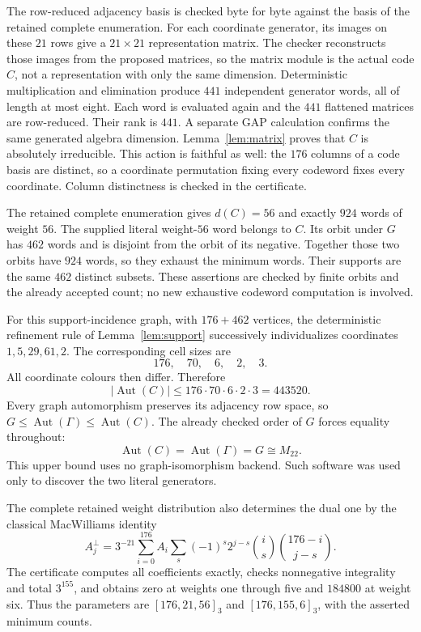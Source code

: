 \documentclass[11pt,a4paper]{article}
\newcommand{\Aut}{\operatorname{Aut}}
\begin{document}
The row-reduced adjacency basis is checked byte for byte against the basis
of the retained complete enumeration. For each coordinate generator, its
images on these $21$ rows give a $21\times21$ representation matrix.
The checker reconstructs those images from the proposed matrices, so the
matrix module is the actual code $C$, not a representation with only the
same dimension. Deterministic multiplication and elimination produce
$441$ independent generator words, all of length at most eight. Each word
is evaluated again and the $441$ flattened matrices are row-reduced.
Their rank is $441$. A separate GAP calculation confirms the same generated
algebra dimension. Lemma~\ref{lem:matrix} proves that $C$ is absolutely
irreducible. This action is faithful as well: the $176$ columns of a code
basis are distinct, so a coordinate permutation fixing every codeword
fixes every coordinate. Column distinctness is checked in the certificate.

The retained complete enumeration gives $d(C)=56$ and exactly $924$ words
of weight $56$. The supplied literal weight-$56$ word belongs to $C$.
Its orbit under $G$ has $462$ words and is disjoint from the orbit of its
negative. Together those two orbits have $924$ words, so they exhaust the
minimum words. Their supports are the same $462$ distinct subsets.
These assertions are checked by finite orbits and the already accepted
count; no new exhaustive codeword computation is involved.

For this support-incidence graph, with $176+462$ vertices, the deterministic
refinement rule of Lemma~\ref{lem:support} successively individualizes
coordinates $1,5,29,61,2$. The corresponding cell sizes are
\[
 176,\quad70,\quad6,\quad2,\quad3.
\]
All coordinate colours then differ. Therefore
\[
 |\Aut(C)|\leq176\cdot70\cdot6\cdot2\cdot3=443520.
\]
Every graph automorphism preserves its adjacency row space, so
$G\leq\Aut(\Gamma)\leq\Aut(C)$. The already checked order of $G$ forces
equality throughout:
\[
 \Aut(C)=\Aut(\Gamma)=G\cong M_{22}.                 \tag{3}
\]
This upper bound uses no graph-isomorphism backend. Such software was
used only to discover the two literal generators.

The complete retained weight distribution also determines the dual one
by the classical MacWilliams identity
\[
 A_j^\perp=3^{-21}\sum_{i=0}^{176}A_i
 \sum_s(-1)^s2^{j-s}\binom{i}{s}\binom{176-i}{j-s}.
\]
The certificate computes all coefficients exactly, checks nonnegative
integrality and total $3^{155}$, and obtains zero at weights one through
five and $184800$ at weight six. Thus the parameters are
$[176,21,56]_3$ and $[176,155,6]_3$, with the asserted minimum counts.
\end{document}
